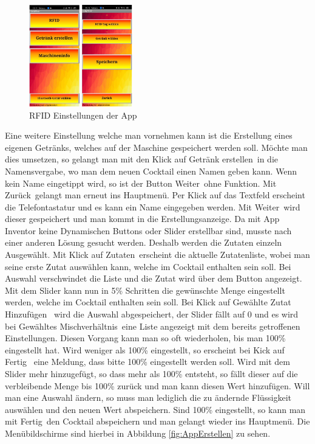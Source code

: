 \begin{figure}[h!]
	\centering
	\includegraphics[width=0.4\textwidth]{graphics/AppRFID}
	\caption{RFID Einstellungen der App}
	\label{fig:AppRFID}
\end{figure}

Eine weitere Einstellung welche man vornehmen kann ist die Erstellung eines eigenen Getränks, welches auf der Maschine gespeichert werden soll. Möchte man dies umsetzen, so gelangt man mit den Klick auf \flqq Getränk erstellen\frqq~in die Namensvergabe, wo man dem neuen Cocktail einen Namen geben kann. Wenn kein Name eingetippt wird, so ist der Button \flqq Weiter\frqq~ohne Funktion. Mit \flqq Zurück\frqq~gelangt man erneut ins Hauptmenü. Per Klick auf das Textfeld erscheint die Telefontastatur und es kann ein Name eingegeben werden. Mit \flqq Weiter\frqq~wird dieser gespeichert und man kommt in die Erstellungsanzeige. Da mit App Inventor keine Dynamischen Buttons oder Slider erstellbar sind, musste nach einer anderen Lösung gesucht werden. Deshalb werden die Zutaten einzeln Ausgewählt. Mit Klick auf \flqq Zutaten\frqq~erscheint die aktuelle Zutatenliste, wobei man seine erste Zutat auswählen kann, welche im Cocktail enthalten sein soll. Bei Auswahl verschwindet die Liste und die Zutat wird über dem Button angezeigt. Mit dem Slider kann nun in 5\% Schritten die gewünschte Menge eingestellt werden, welche im Cocktail enthalten sein soll. Bei Klick auf \flqq Gewählte Zutat Hinzufügen\frqq~ wird die Auswahl abgespeichert, der Slider fällt auf 0 und es wird bei \flqq Gewähltes Mischverhältnis\frqq~eine Liste angezeigt mit dem bereits getroffenen Einstellungen. Diesen Vorgang kann man so oft wiederholen, bis man 100\% eingestellt hat. Wird weniger als 100\% eingestellt, so erscheint bei Kick auf \flqq Fertig\frqq~ eine Meldung, dass bitte 100\% eingestellt werden soll. Wird mit dem Slider mehr hinzugefügt, so dass mehr als 100\% entsteht, so fällt dieser auf die verbleibende Menge bis 100\% zurück und man kann diesen Wert hinzufügen. Will man eine Auswahl ändern, so muss man lediglich die zu ändernde Flüssigkeit auswählen und den neuen Wert abspeichern. Sind 100\% eingestellt, so kann man mit \flqq Fertig\frqq~den Cocktail abspeichern und man gelangt wieder ins Hauptmenü. Die Menübildschirme sind hierbei in Abbildung \ref{fig:AppErstellen} zu sehen.\\

